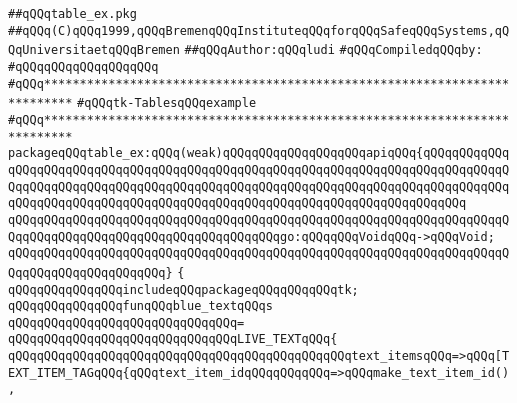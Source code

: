 \label{src/lib/tk/src/toolkit/tests+examples/table_ex.pkg}
\verb|##qQQqtable_ex.pkg|\newline
\verb|##qQQq(C)qQQq1999,qQQqBremenqQQqInstituteqQQqforqQQqSafeqQQqSystems,qQQqUniversitaetqQQqBremen|\newline
\verb|##qQQqAuthor:qQQqludi|\newline
\newline
\verb|#qQQqCompiledqQQqby:|\newline
\verb|#qQQqqQQqqQQqqQQqqQQq|\newline
\newline
\newline
\newline
\verb|#qQQq**************************************************************************|\newline
\verb|#qQQqtk-TablesqQQqexample|\newline
\verb|#qQQq**************************************************************************|\newline
\newline
\verb|packageqQQqtable_ex:qQQq(weak)qQQqqQQqqQQqqQQqqQQqapiqQQq{qQQqqQQqqQQqqQQqqQQqqQQqqQQqqQQqqQQqqQQqqQQqqQQqqQQqqQQqqQQqqQQqqQQqqQQqqQQqqQQqqQQqqQQqqQQqqQQqqQQqqQQqqQQqqQQqqQQqqQQqqQQqqQQqqQQqqQQqqQQqqQQqqQQqqQQqqQQqqQQqqQQqqQQqqQQqqQQqqQQqqQQqqQQqqQQqqQQqqQQqqQQqqQQqqQQqqQQq|\newline
\verb|qQQqqQQqqQQqqQQqqQQqqQQqqQQqqQQqqQQqqQQqqQQqqQQqqQQqqQQqqQQqqQQqqQQqqQQqqQQqqQQqqQQqqQQqqQQqqQQqqQQqqQQqqQQqgo:qQQqqQQqVoidqQQq->qQQqVoid;|\newline
\verb|qQQqqQQqqQQqqQQqqQQqqQQqqQQqqQQqqQQqqQQqqQQqqQQqqQQqqQQqqQQqqQQqqQQqqQQqqQQqqQQqqQQqqQQqqQQq}|\newline
\verb|{|\newline
\newline
\verb|qQQqqQQqqQQqqQQqincludeqQQqpackageqQQqqQQqqQQqtk;|\newline
\newline
\verb|qQQqqQQqqQQqqQQqfunqQQqblue_textqQQqs|\newline
\verb|qQQqqQQqqQQqqQQqqQQqqQQqqQQqqQQq=|\newline
\verb|qQQqqQQqqQQqqQQqqQQqqQQqqQQqqQQqLIVE_TEXTqQQq{|\newline
\verb|qQQqqQQqqQQqqQQqqQQqqQQqqQQqqQQqqQQqqQQqqQQqqQQqtext_itemsqQQq=>qQQq[TEXT_ITEM_TAGqQQq{qQQqtext_item_idqQQqqQQqqQQq=>qQQqmake_text_item_id(),|\newline
